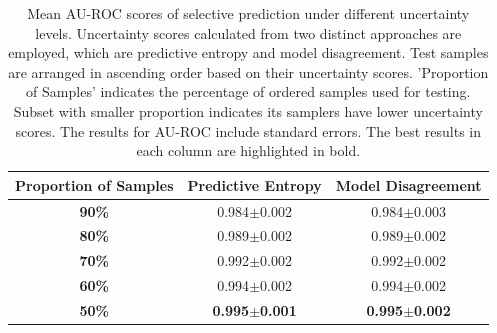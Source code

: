 \documentclass[10pt]{article} %
\begin{document}
\begin{table}[!htp]
\caption{Mean AU-ROC scores of selective prediction under different uncertainty levels. Uncertainty scores calculated from two distinct approaches are employed, which are predictive entropy and model disagreement. Test samples are arranged in ascending order based on their uncertainty scores. 'Proportion of Samples' indicates the percentage of ordered samples used for testing. Subset with smaller proportion indicates
its samplers have lower uncertainty scores. The results for AU-ROC include standard errors. The best results in each column are highlighted in bold.}
\label{table: VIFA_uncertainty_auroc}
\begin{center}
\begin{tabular}{c|cc}
\textbf{Proportion of Samples} & \textbf{Predictive Entropy} & \textbf{Model Disagreement} \\ \hline
\textbf{90\%}                               & 0.984$\pm$0.002                 & 0.984$\pm$0.003                 \\
\textbf{80\%}                               & 0.989$\pm$0.002                 & 0.989$\pm$0.002                 \\
\textbf{70\%}                               & 0.992$\pm$0.002                 & 0.992$\pm$0.002                 \\
\textbf{60\%}                               & 0.994$\pm$0.002                 & 0.994$\pm$0.002                 \\
\textbf{50\%}                               & \textbf{0.995$\pm$0.001}                 & \textbf{0.995$\pm$0.002}                
\end{tabular}
\end{center}
\end{table}
\end{document}
